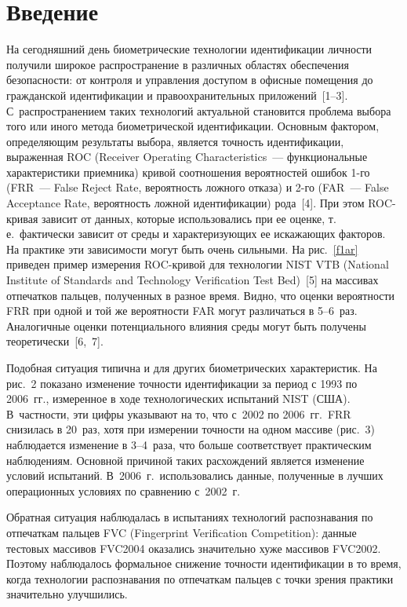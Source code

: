       \begin{multicols}{2}

      \label{st\stat}

\section{Введение }

  На сегодняшний день биометрические технологии идентификации личности получили 
широкое распространение в различных областях обеспечения безопасности: от контроля и 
управления доступом в офисные помещения до гражданской идентификации и 
правоохранительных приложений~[1--3]. С~распространением таких технологий актуальной 
становится проблема выбора того или иного метода биометрической идентификации. Основным 
фактором, определяющим результаты выбора, является точность идентификации, выраженная 
ROC (Receiver Operating Characteristics~--- функциональные характеристики приемника)
кривой соотношения вероятностей ошибок 1-го (FRR~--- False Reject Rate, вероятность ложного отказа)
и 2-го (FAR~--- False Acceptance Rate, вероятность ложной идентификации) рода~[4]. При этом 
  ROC-кривая зависит от данных, которые использовались при ее оценке, т.\,е.\ фактически 
зависит от среды и ха\-рак\-те\-ри\-зу\-ющих ее искажающих факторов. На практике эти зависимости 
могут быть очень сильными. На рис.~\ref{f1ar} приведен пример измерения ROC-кривой для 
технологии NIST VTB (National Institute of Standards and
Technology Verification Test Bed)~[5] на массивах отпечатков пальцев, полученных в разное время. Видно, 
что оценки вероятности FRR при одной и той же вероятности FAR могут различаться в 5--6~раз. 
Аналогичные оценки потенциального влияния среды могут быть получены теоретически~[6,~7].
  
  Подобная ситуация типична и для других биометрических характеристик. На рис.~2 
показано изменение точности идентификации за период с 1993 по 2006~гг., измеренное в ходе 
технологических испытаний NIST (США). В~частности, эти цифры указывают на то, что с~2002 
по 2006~гг.\ FRR снизилась в 20~раз, хотя при измерении точности на одном массиве (рис.~3)
наблюдается изменение в 3--4~раза, что больше соответствует практическим наблюдениям. 
Основной причиной таких рас\-хож\-де\-ний является изменение условий испытаний. В~2006~г.\ 
использовались данные, полученные в лучших операционных условиях по сравнению с~2002~г.\ 

Обрат\-ная си\-ту\-а\-ция наблюдалась в испытаниях технологий распознавания по отпечаткам пальцев 
FVC (Fingerprint Verification Competition): данные тестовых массивов FVC2004 оказались значительно хуже массивов FVC2002. 
Поэтому наблюдалось формальное снижение точности идентификации в то время, когда 
технологии распознавания по отпечаткам пальцев с точки зрения практики значительно 
улучшились.


\end{multicols}

